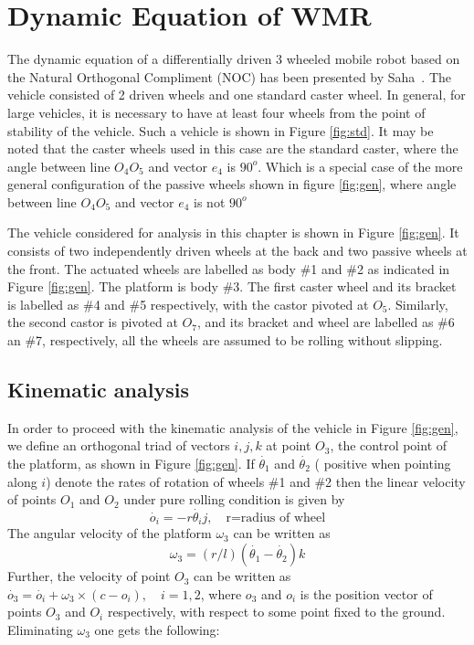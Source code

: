 \section{Dynamic Equation of WMR}
\label{sec:DynamicNoSlip}
The dynamic equation of a differentially driven 3 wheeled mobile robot based on the  Natural Orthogonal Compliment (NOC) has been presented by Saha~\cite{saha1991dynamics}. The vehicle consisted of 2 driven wheels and one standard caster wheel. In general, for large vehicles, it is necessary to have at least four wheels from the point of stability of the vehicle. Such a vehicle  is shown in Figure \ref{fig:std}. It may be noted that the caster wheels used in this case are the standard caster, where the angle between line $O_4O_5$ and vector $e_4$ is  $90^o$. Which is a special case of the more general configuration of the passive wheels shown in figure \ref{fig:gen}, where angle between line $O_4O_5$ and vector $e_4$ is not $90^o$

 The vehicle considered for analysis in this chapter is shown in Figure \ref{fig:gen}. It consists of two independently driven wheels at the back and two passive wheels at the front. The actuated wheels are labelled as body \#1 and \#2 as indicated in Figure \ref{fig:gen}. The platform is body \#3. The first caster wheel and its bracket is labelled as \#4 and \#5 respectively, with the castor pivoted at $O_5$. Similarly, the second castor is pivoted at $O_7$, and its bracket and wheel are labelled as \#6 an \#7, respectively, all the wheels are assumed to be rolling without slipping.  
\subsection{Kinematic analysis}
In order to proceed with the kinematic analysis of the vehicle in Figure \ref{fig:gen}, we define an orthogonal triad of vectors ${i,j,k}$ at point $O_3$, the control point of the platform, as shown in Figure \ref{fig:gen}. If $\dot{\theta_1}$ and $\dot{\theta_2}$ {( positive when pointing along $i$)} denote the rates of rotation of wheels \#1 and \#2 then the linear velocity of points $O_1$ and $O_2$ under pure rolling condition is given by 
\begin{equation}
\label{velO1}
{\dot{o_i}}=-r\dot{\theta_i}j, \quad \text{r=radius of wheel}
\end{equation}
The angular velocity of the platform $\omega_3$ can be written as 
\begin{equation}
\label{omegaPlat}
{\omega_3}=(r/l)(\dot{\theta_1}-\dot{\theta_2}){k}
\end{equation}
Further, the velocity of point $O_3$ can be written as
${\dot{o_3}=\dot{o_i}+\omega_3 \times (c-o_i)}, \quad i=1,2$, where $o_3 $ and $o_i$  is the position vector of points $O_3$ and $O_i$ respectively, with respect to some  point fixed to the ground. Eliminating $\omega_3$  one gets the following:

